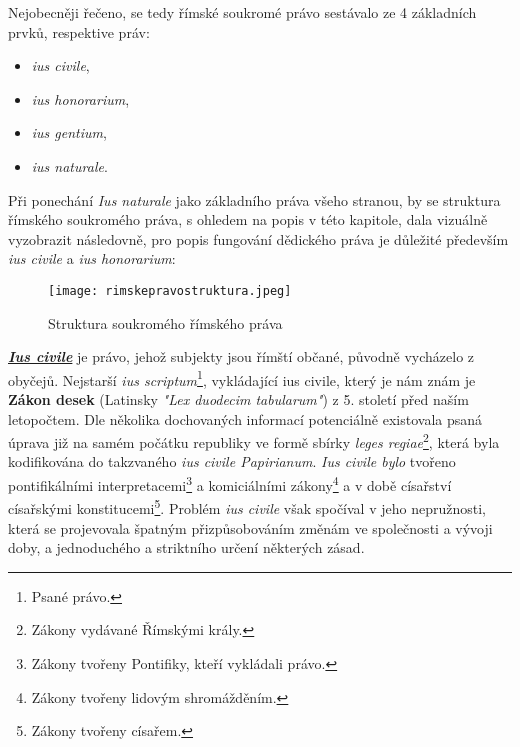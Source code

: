 \documentclass{article}
\begin{document}

Nejobecněji řečeno, se tedy římské soukromé právo sestávalo ze 4 základních prvků, respektive práv:
\vspace{5 mm}

\begin{itemize}
\item \textit{ius civile},
\item \textit{ius honorarium},
\item \textit{ius gentium},
\item \textit{ius naturale}.
\end{itemize}

\vspace{5 mm}


Při ponechání \textit{Ius naturale} jako základního práva všeho stranou, by se struktura římského soukromého práva, s ohledem na popis v této kapitole, dala vizuálně vyzobrazit následovně, pro popis fungování dědického práva je důležité především \textit{ius civile} a \textit{ius honorarium}:

\begin{figure}[h]
\centering
\texttt{[image: rimskepravostruktura.jpeg]}
\caption{Struktura soukromého římského práva}
\label{fig:struktura}
\end{figure}

\underline{\textbf{\textit{Ius civile}}} je právo, jehož subjekty jsou římští občané, původně vycházelo z obyčejů. Nejstarší \textit{ius scriptum}\footnote{Psané právo.}, vykládající ius civile, který je nám znám je \textbf{Zákon \MakeUppercase{} desek} (Latinsky \textit{"Lex duodecim tabularum"}) z 5. století před naším letopočtem. Dle několika dochovaných informací potenciálně existovala psaná úprava již na samém počátku republiky ve formě sbírky \textit{leges regiae}\footnote{Zákony vydávané Římskými krály.}, která byla kodifikována do takzvaného \textit{ius civile Papirianum}. \textit{Ius civile bylo} tvořeno pontifikálními interpretacemi\footnote{Zákony tvořeny Pontifiky, kteří vykládali právo.} a komiciálními zákony\footnote{Zákony tvořeny lidovým shromážděním.} a v době císařství císařskými konstitucemi\footnote{Zákony tvořeny císařem.}. Problém \textit{ius civile} však spočíval v jeho nepružnosti, která se projevovala špatným přizpůsobováním změnám ve společnosti a vývoji doby, a jednoduchého a striktního určení některých zásad. \\
\end{document}
